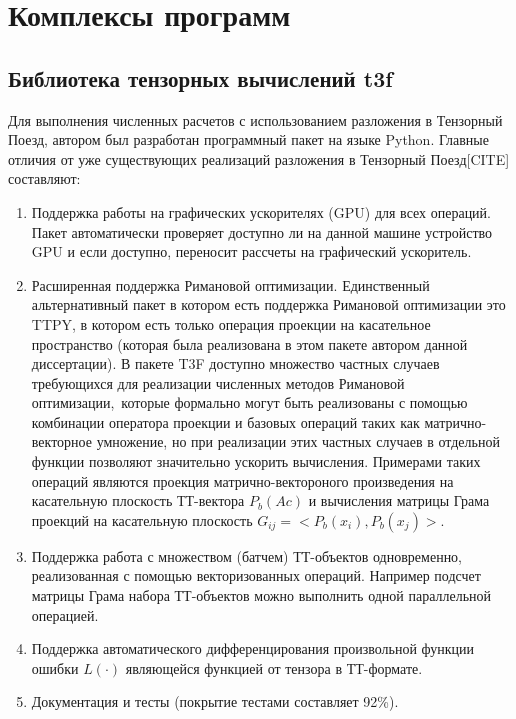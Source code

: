 \chapter{Комплексы программ} \label{chap:exm}
\section{Библиотека тензорных вычислений t3f} \label{sec:t3f}
Для выполнения численных расчетов с использованием разложения в Тензорный Поезд, автором был разработан программный пакет на языке Python. Главные отличия от уже существующих реализаций разложения в Тензорный Поезд[CITE] составляют:
\begin{enumerate}
	\item Поддержка работы на графических ускорителях (GPU) для всех операций. Пакет автоматически проверяет доступно ли на данной машине устройство GPU и если доступно, переносит рассчеты на графический ускоритель.
	\item Расширенная поддержка Римановой оптимизации. Единственный альтернативный пакет в котором есть поддержка Римановой оптимизации это TTPY, в котором есть только операция проекции на касательное пространство (которая была реализована в этом пакете автором данной диссертации). В пакете T3F доступно множество частных случаев требующихся для реализации численных методов Римановой оптимизации, которые формально могут быть реализованы с помощью комбинации оператора проекции и базовых операций таких как матрично-векторное умножение, но при реализации этих частных случаев в отдельной функции позволяют значительно ускорить вычисления. Примерами таких операций являются проекция матрично-вектороного произведения на касательную плоскость ТТ-вектора $P_b(A c)$ и вычисления матрицы Грама проекций на касательную плоскость $G_{ij} = <P_b(x_i), P_b(x_j)>$.
	\item Поддержка работа с множеством (батчем) ТТ-объектов одновременно, реализованная с помощью векторизованных операций. Например подсчет матрицы Грама набора ТТ-объектов можно выполнить одной параллельной операцией.
	\item Поддержка автоматического дифференцирования произвольной функции ошибки $L(\cdot)$ являющейся функцией от тензора в ТТ-формате.
	\item Документация и тесты (покрытие тестами составляет 92\%).
\end{enumerate}

